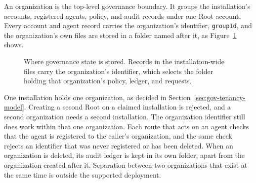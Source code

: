 An organization is the top-level governance boundary. It groups the
installation's accounts, registered agents, policy, and audit records under
one Root account. Every account and agent record carries the
organization's identifier, \texttt{groupId}, and the organization's own
files are stored in a folder named after it, as
Figure~\ref{fig:gov-tenant} shows.

\begin{figure}[htbp]
\centering
{}
\caption{Where governance state is stored. Records in the installation-wide
files carry the organization's identifier, which selects the folder holding
that organization's policy, ledger, and requests.}
\label{fig:gov-tenant}
\end{figure}

One installation holds one organization, as decided in
Section~\ref{sec:gov-tenancy-model}. Creating a second Root on a claimed
installation is rejected, and a second organization needs a second
installation. The organization identifier still does work within that one
organization. Each route that acts on an agent checks that the agent is
registered to the caller's organization, and the same check rejects an
identifier that was never registered or has been deleted. When an
organization is deleted, its audit ledger is kept in its own folder, apart
from the organization created after it. Separation between two
organizations that exist at the same time is outside the supported
deployment.

